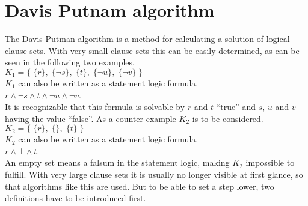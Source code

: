 \section{Davis Putnam algorithm}
The Davis Putman algorithm is a method for calculating a solution of logical clause sets. With very small clause sets this can be easily determined, as can be seen in the following two examples.
\\
\hspace*{1.3cm} 
$K_1 = \bigl\{\; \{r\},\; \{\neg s\},\; \{t\},\; \{\neg u\}, \; \{\neg v\} \;\bigr\}$ 
\\[0.2cm]
$K_1$ %
can also be written as a statement logic formula.
\\[0.2cm]
\hspace*{1.3cm}
$r \land \neg s \land t \land \neg u \land \neg v$.
\\[0.2cm]
It is recognizable that this formula is solvable by $r$ and $t$ \enquote{true} and $s$, $u$ and $v$ having the value \enquote{false}.
As a counter example $K_2$ is to be considered.
\\
\hspace*{1.3cm}
$K_2 = \bigl\{\; \{r\},\; \{\},\; \{t\} \;\bigr\}$ 
\\[0.2cm]
$K_2$ can also be written as a statement logic formula.
\\[0.2cm]
\hspace*{1.3cm}
$r \land \bot \land t$.
\\[0.2cm]
An empty set means a falsum in the statement logic, making $K_2$ impossible to fulfill.
With very large clause sets it is usually no longer visible at first glance, so that algorithms like this are used. But to be able to set a step lower, two definitions have to be introduced first. \cite{Zhang2000}
